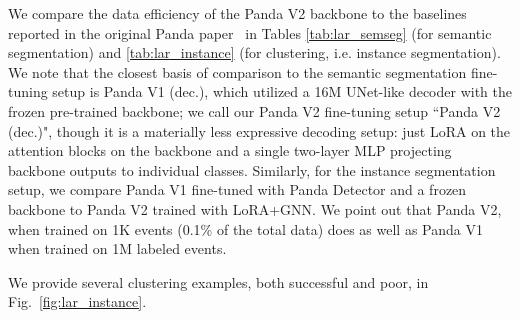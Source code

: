We compare the data efficiency of the Panda V2 backbone to the baselines reported in the original Panda paper~\cite{panda} in Tables \ref{tab:lar_semseg} (for semantic segmentation) and \ref{tab:lar_instance} (for clustering, i.e. instance segmentation). We note that the closest basis of comparison to the semantic segmentation fine-tuning setup is Panda V1 (dec.), which utilized a 16M UNet-like decoder with the frozen pre-trained backbone; we call our Panda V2 fine-tuning setup ``Panda V2 (dec.)", though it is a materially less expressive decoding setup: just LoRA on the attention blocks on the backbone and a single two-layer MLP projecting backbone outputs to individual classes. Similarly, for the instance segmentation setup, we compare Panda V1 fine-tuned with Panda Detector and a frozen backbone to Panda V2 trained with LoRA+GNN. We point out that Panda V2, when trained on 1K events (0.1\% of the total data) does as well as Panda V1 when trained on 1M labeled events. 

We provide several clustering examples, both successful and poor, in Fig.~\ref{fig:lar_instance}.

\begin{table}[t]
\hspace{-5mm}
    \begin{minipage}{0.5\linewidth}
    \centering
        
        \vspace{-1mm}
        \label{tab:lar_semseg}
        \vspace{1mm}
\end{minipage}
\hspace{1mm}
\begin{minipage}{0.55\linewidth}
    \centering
{}
    
    \vspace{-1mm}
    \label{tab:lar_instance}
    \vspace{1mm}
    \end{minipage}
\end{table}

